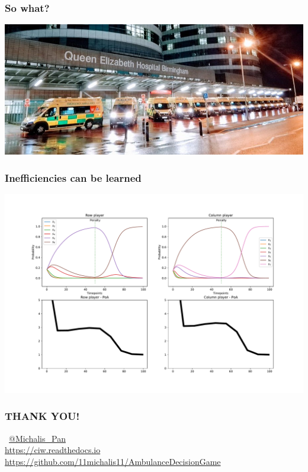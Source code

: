 \begin{frame}
    \frametitle{So what?}

    \centering
    \includegraphics[scale=0.45]{Bin/ambulance_queue.jpg}

\end{frame}


\begin{frame}
    \frametitle{Inefficiencies can be learned}
    \centering

    \includegraphics[scale=0.28]{Bin/penalised_game.pdf}

\end{frame}


\begin{frame}
    \frametitle{THANK YOU!}
    \centering
    \color{orange}

    
    
    \vspace{0.5cm}

    \textbf{\faTwitterSquare} \, \url{@Michalis_Pan} \\
    \url{https://ciw.readthedocs.io}
    \url{https://github.com/11michalis11/AmbulanceDecisionGame}
    

\end{frame}